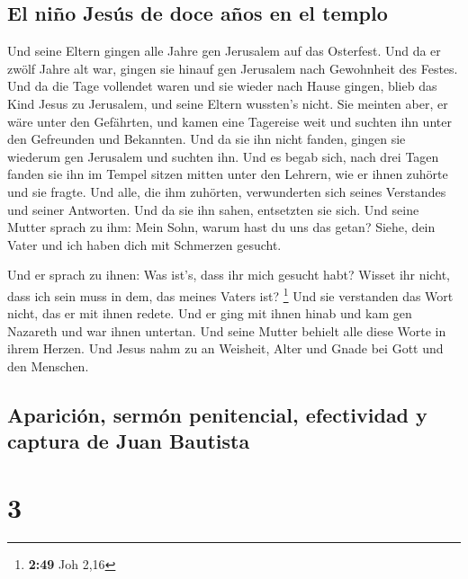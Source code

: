 \hypertarget{el-niuxf1o-jesuxfas-de-doce-auxf1os-en-el-templo}{%
\subsection{El niño Jesús de doce años en el
templo}\label{el-niuxf1o-jesuxfas-de-doce-auxf1os-en-el-templo}}

 Und seine Eltern gingen alle Jahre gen Jerusalem auf das
Osterfest.  Und da er zwölf Jahre alt war, gingen sie
hinauf gen Jerusalem nach Gewohnheit des Festes.  Und da
die Tage vollendet waren und sie wieder nach Hause gingen, blieb das
Kind Jesus zu Jerusalem, und seine Eltern wussten's nicht.
 Sie meinten aber, er wäre unter den Gefährten, und kamen
eine Tagereise weit und suchten ihn unter den Gefreunden und Bekannten.
 Und da sie ihn nicht fanden, gingen sie wiederum gen
Jerusalem und suchten ihn.  Und es begab sich, nach drei
Tagen fanden sie ihn im Tempel sitzen mitten unter den Lehrern, wie er
ihnen zuhörte und sie fragte.  Und alle, die ihm
zuhörten, verwunderten sich seines Verstandes und seiner Antworten.
 Und da sie ihn sahen, entsetzten sie sich. Und seine
Mutter sprach zu ihm: Mein Sohn, warum hast du uns das getan? Siehe,
dein Vater und ich haben dich mit Schmerzen gesucht.

 Und er sprach zu ihnen: Was ist's, dass ihr mich gesucht
habt? Wisset ihr nicht, dass ich sein muss in dem, das meines Vaters
ist? \footnote{\textbf{2:49} Joh 2,16}  Und sie
verstanden das Wort nicht, das er mit ihnen redete.  Und
er ging mit ihnen hinab und kam gen Nazareth und war ihnen untertan. Und
seine Mutter behielt alle diese Worte in ihrem Herzen. 
Und Jesus nahm zu an Weisheit, Alter und Gnade bei Gott und den
Menschen.

\hypertarget{apariciuxf3n-sermuxf3n-penitencial-efectividad-y-captura-de-juan-bautista}{%
\subsection{Aparición, sermón penitencial, efectividad y captura de Juan
Bautista}\label{apariciuxf3n-sermuxf3n-penitencial-efectividad-y-captura-de-juan-bautista}}

\hypertarget{section-2}{%
\section{3}\label{section-2}}

